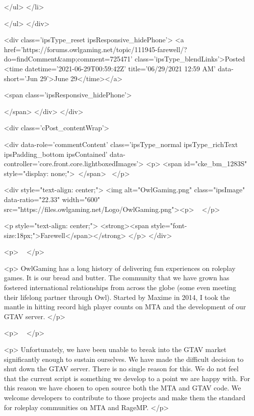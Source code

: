                         
						
						
						
							
								
							
							
							
							
							
							
						
					</ul>
				</li>
				
			</ul>
		</div>

		<div class='ipsType_reset ipsResponsive_hidePhone'>
			<a href='https://forums.owlgaming.net/topic/111945-farewell/?do=findComment&amp;comment=725471' class='ipsType_blendLinks'>Posted <time datetime='2021-06-29T00:59:42Z' title='06/29/2021 12:59  AM' data-short='Jun 29'>June 29</time></a> 
			
			<span class='ipsResponsive_hidePhone'>
				
				
			</span>
		</div>
	</div>

	

    

	<div class='cPost_contentWrap'>
		
		<div data-role='commentContent' class='ipsType_normal ipsType_richText ipsPadding_bottom ipsContained' data-controller='core.front.core.lightboxedImages'>
			<p>
	<span id="cke_bm_1283S" style="display: none;"> </span> 
</p>

<div style="text-align: center;">
	<img alt="OwlGaming.png" class="ipsImage" data-ratio="22.33" width="600" src="https://files.owlgaming.net/Logo/OwlGaming.png"><p>
		 
	</p>

	<p style="text-align: center;">
		<strong><span style="font-size:18px;">Farewell</span></strong>
	</p>
</div>

<p>
	 
</p>

<p>
	OwlGaming has a long history of delivering fun experiences on roleplay games. It is our bread and butter. The community that we have grown has fostered international relationships from across the globe (some even meeting their lifelong partner through Owl). Started by Maxime in 2014, I took the mantle in hitting record high player counts on MTA and the development of our GTAV server.
</p>

<p>
	 
</p>

<p>
	Unfortunately, we have been unable to break into the GTAV market significantly enough to sustain ourselves. We have made the difficult decision to shut down the GTAV server. There is no single reason for this. We do not feel that the current script is something we develop to a point we are happy with. For this reason we have chosen to open source both the MTA and GTAV code. We welcome developers to contribute to those projects and make them the standard for roleplay communities on MTA and RageMP.
</p>

